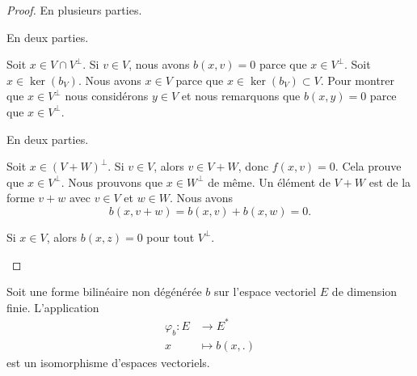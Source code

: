 \begin{proof}
	En plusieurs parties.
	\begin{subproof}

		En deux parties.
		\begin{subproof}
			Soit \( x\in V\cap V^{\perp}\). Si \( v\in V\), nous avons \( b(x,v)=0\) parce que \( x\in V^{\perp}\).
			Soit \( x\in\ker(b_V)\). Nous avons \( x\in V\) parce que \( x\in \ker(b_V)\subset V\). Pour montrer que \( x\in V^{\perp}\) nous considérons \( y\in V\) et nous remarquons que \( b(x,y)=0\) parce que \( x\in V^{\perp}\).

		\end{subproof}
		\spitem[Pour \ref{ITEMooUZZFooDbuddF}]
		En deux parties.
		\begin{subproof}
			\spitem[\( (V+W)^{\perp}\subset V^{\perp}\cap W^{\perp}\)]
			Soit \( x\in (V+W)^{\perp}\). Si \( v\in V\), alors \( v\in V+W\), donc \( f(x,v)=0\). Cela prouve que \( x\in V^{\perp}\). Nous prouvons que \( x\in W^{\perp}\) de même.
			\spitem[\(  V^{\perp}\cap W^{\perp} \subset  (V+W)^{\perp}\)]
			Un élément de \( V+W\) est de la forme \( v+w\) avec \( v\in V\) et \( w\in W\). Nous avons
			\begin{equation}
				b(x,v+w)=b(x,v)+b(x,w)=0.
			\end{equation}
		\end{subproof}
		\spitem[Pour \ref{ITEMooSZAGooLgkzYw}]
		Si \( x\in V\), alors \( b(x,z)=0\) pour tout \( V^{\perp}\).
	\end{subproof}
\end{proof}

\begin{proposition}		\label{PROPooMAZZooRZZoHj}
	Soit une forme bilinéaire non dégénérée \( b\) sur l'espace vectoriel \( E\) de dimension finie. L'application
	\begin{equation}
		\begin{aligned}
			\varphi_b\colon E & \to E^*        \\
			x                 & \mapsto b(x,.)
		\end{aligned}
	\end{equation}
	est un isomorphisme d'espaces vectoriels.
\end{proposition}

